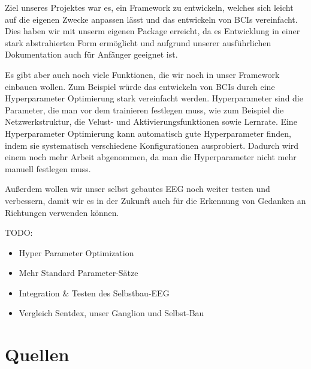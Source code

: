 \documentclass[10pt]{article}
\begin{document}
Ziel unseres Projektes war es, ein Framework zu entwickeln, welches sich leicht auf die eigenen Zwecke anpassen lässt und das entwickeln von BCIs vereinfacht. Dies haben wir mit unserm eigenen Package erreicht, da es Entwicklung in einer stark abstrahierten Form ermöglicht und aufgrund unserer ausführlichen Dokumentation auch für Anfänger geeignet ist.

Es gibt aber auch noch viele Funktionen, die wir noch in unser Framework einbauen wollen. Zum Beispiel würde das entwickeln von BCIs durch eine Hyperparameter Optimierung stark vereinfacht werden. Hyperparameter sind die Parameter, die man vor dem trainieren festlegen muss, wie zum Beispiel die Netzwerkstruktur, die Velust- und Aktivierungsfunktionen sowie Lernrate. Eine Hyperparameter Optimierung kann automatisch gute Hyperparameter finden, indem sie systematisch verschiedene Konfigurationen ausprobiert. Dadurch wird einem noch mehr Arbeit abgenommen, da man die Hyperparameter nicht mehr manuell festlegen muss.

Außerdem wollen wir unser selbst gebautes EEG noch weiter testen und verbessern, damit wir es in der Zukunft auch für die Erkennung von Gedanken an Richtungen verwenden können.

TODO:
\begin{itemize}
    \item Hyper Parameter Optimization
    \item Mehr Standard Parameter-Sätze
    \item Integration \& Testen des Selbstbau-EEG
    \item Vergleich Sentdex, unser Ganglion und Selbst-Bau
\end{itemize}

\section{Quellen}
\end{document}
